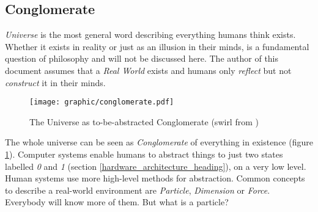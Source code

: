 %
%
%
%
%
%
%

\subsection{Conglomerate}
\label{conglomerate_heading}

\emph{Universe} is the most general word describing everything humans think
exists. Whether it exists in reality or just as an illusion in their minds, is
a fundamental question of philosophy and will not be discussed here. The author
of this document assumes that a \emph{Real World} exists and humans only
\emph{reflect} but not \emph{construct} it in their minds.

\begin{figure}[ht]
    \begin{center}
        \texttt{[image: graphic/conglomerate.pdf]}
        \caption{The Universe as to-be-abstracted Conglomerate (swirl from \cite{debian})}
        \label{conglomerate_figure}
    \end{center}
\end{figure}

The whole universe can be seen as \emph{Conglomerate} of everything in
existence (figure \ref{conglomerate_figure}). Computer systems enable humans to
abstract things to just two states labelled \emph{0} and \emph{1} (section
\ref{hardware_architecture_heading}), on a very low level. Human systems use
more high-level methods for abstraction. Common concepts to describe a
real-world environment are \emph{Particle}, \emph{Dimension} or \emph{Force}.
Everybody will know more of them. But what is a particle?
